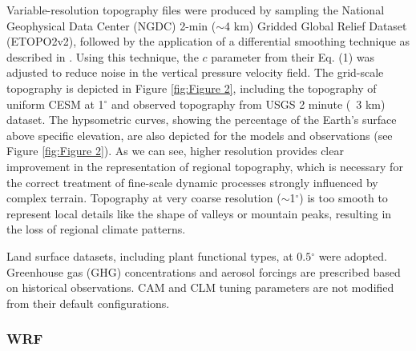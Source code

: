 \documentclass[draft,ms]{agutex}   %
\begin{document}
\begin{article}
Variable-resolution topography files were produced by sampling the National Geophysical Data Center (NGDC) 2-min ($\sim$4 km) Gridded Global Relief Dataset (ETOPO2v2), followed by the application of a differential smoothing technique as described in \cite{zarzycki2015effects}.  Using this technique, the $c$ parameter from their Eq. (1) was adjusted to reduce noise in the vertical pressure velocity field. The grid-scale topography is depicted in Figure \ref{fig:Figure 2}, including the topography of uniform CESM at 1$^\circ$ and observed topography from USGS 2 minute (~3 km) dataset. The hypsometric curves, showing the percentage of the Earth's surface above specific elevation, are also depicted for the models and observations (see Figure \ref{fig:Figure 2}). As we can see, higher resolution provides clear improvement in the representation of regional topography, which is necessary for the correct treatment of fine-scale dynamic processes strongly influenced by complex terrain. Topography at very coarse resolution ($\sim$1$^\circ$) is too smooth to represent local details like the shape of valleys or mountain peaks, resulting in the loss of regional climate patterns.

Land surface datasets, including plant functional types, at $0.5$$^\circ$ were adopted. Greenhouse gas (GHG) concentrations and aerosol forcings are prescribed based on historical observations. CAM and CLM tuning parameters are not modified from their default configurations.


\subsubsection{WRF} 


\end{article}
\end{document}
